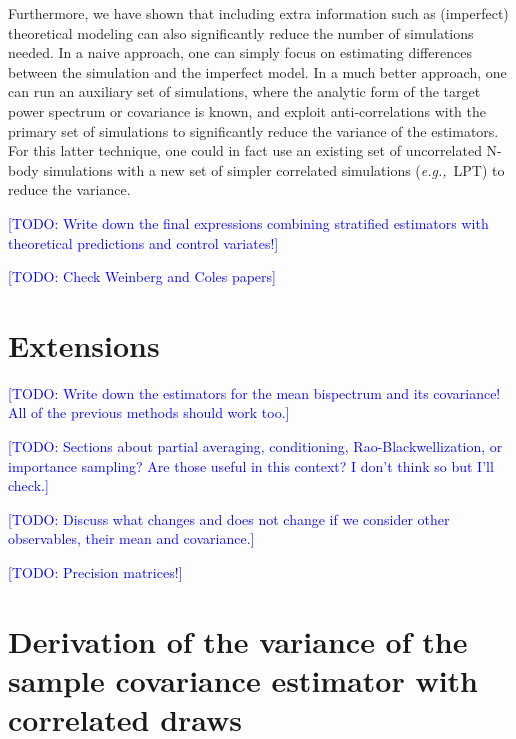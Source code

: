 \documentclass{aastex6}
\newcommand{\eg}{{\textit{e.g.,}~}}
\newcommand{\todo}[1]{\textcolor{blue}{[TODO: #1]}}
\begin{document}
Furthermore, we have shown that including extra information such as (imperfect) theoretical modeling can also significantly reduce the number of simulations needed. In a naive approach, one can simply focus on estimating differences between the simulation and the imperfect model. In a much better approach, one can run an auxiliary set of simulations, where the analytic form of the target power spectrum or covariance is known, and exploit anti-correlations with the primary set of simulations to significantly reduce the variance of the estimators.
For this latter technique, one could in fact use an existing set of uncorrelated N-body simulations with a new set of simpler correlated simulations (\eg  LPT) to reduce the variance.

\todo{Write down the final expressions combining stratified estimators with theoretical predictions and control variates!}

\todo{Check Weinberg and Coles papers}


\section{Extensions}

\todo{Write down the estimators for the mean bispectrum and its covariance! All of the previous methods should work too.}

\todo{Sections about partial averaging, conditioning, Rao-Blackwellization, or importance sampling? Are those useful in this context? I don't think so but I'll check.}

\todo{Discuss what changes and does not change if we consider other observables, their mean and covariance.}

\todo{Precision matrices!}



\newpage
\appendix
\section{Derivation of the variance of the sample covariance estimator with correlated draws}\label{sec:samplecovariancecorrelateddraws}
\end{document}
